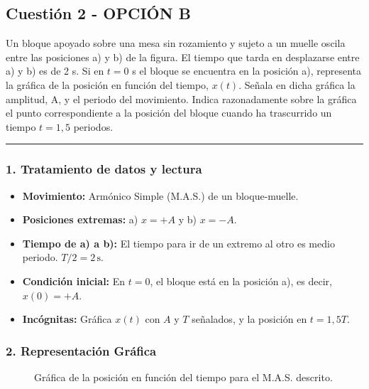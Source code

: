 \newpage

\subsection{Cuestión 2 - OPCIÓN B}
\label{subsec:2B_2015_jul_ext}

\begin{cajaenunciado}
Un bloque apoyado sobre una mesa sin rozamiento y sujeto a un muelle oscila entre las posiciones a) y b) de la figura. El tiempo que tarda en desplazarse entre a) y b) es de 2 s. Si en $t=0$ s el bloque se encuentra en la posición a), representa la gráfica de la posición en función del tiempo, $x(t)$. Señala en dicha gráfica la amplitud, A, y el periodo del movimiento. Indica razonadamente sobre la gráfica el punto correspondiente a la posición del bloque cuando ha trascurrido un tiempo $t=1,5$ periodos.
\end{cajaenunciado}
\hrule

\subsubsection*{1. Tratamiento de datos y lectura}
\begin{itemize}
    \item \textbf{Movimiento:} Armónico Simple (M.A.S.) de un bloque-muelle.
    \item \textbf{Posiciones extremas:} a) $x=+A$ y b) $x=-A$.
    \item \textbf{Tiempo de a) a b):} El tiempo para ir de un extremo al otro es medio periodo. $T/2 = 2 \, \text{s}$.
    \item \textbf{Condición inicial:} En $t=0$, el bloque está en la posición a), es decir, $x(0) = +A$.
    \item \textbf{Incógnitas:} Gráfica $x(t)$ con $A$ y $T$ señalados, y la posición en $t=1,5T$.
\end{itemize}

\subsubsection*{2. Representación Gráfica}
\begin{figure}[H]
    \centering
    \caption{Gráfica de la posición en función del tiempo para el M.A.S. descrito.}
\end{figure}

